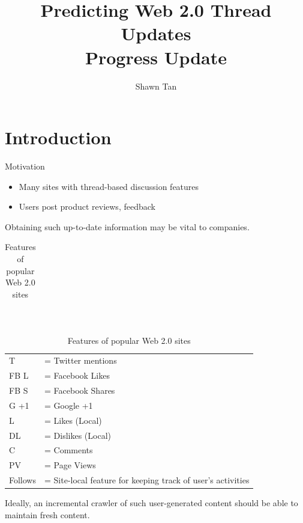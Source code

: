 \documentclass[compress]{beamer}
\title{Predicting Web 2.0 Thread Updates\\Progress Update}
\author{Shawn Tan}
\date{}
\begin{document}
\maketitle
\section{Introduction}

\begin{frame}{Motivation}
	\begin{itemize}
		\item Many sites with thread-based discussion features
		\item Users post product reviews, feedback
	\end{itemize}
	Obtaining such up-to-date information may be vital to companies.
\end{frame}

\begin{frame}
\fontsize{6pt}{7.2}\selectfont
	\begin{table}\label{table:web20}
		{
		\begin{tabular}{|l|c|c|c|c|c|c|c|c|c|c|}
			\hline
				
			\hline
		\end{tabular}
		~\\
		}
		{
	\caption{Features of popular Web 2.0 sites}
		\begin{tabular}{l l}
			   T &= Twitter mentions\\
			FB L &= Facebook Likes \\
			FB S &= Facebook Shares\\
			G +1 &= Google +1 \\
			   L &= Likes (Local) \\
			  DL &= Dislikes (Local) \\
			   C &= Comments \\
			  PV &= Page Views \\
		 Follows &= Site-local feature for keeping track of user's activities
		\end{tabular}
	}
	\end{table}
\end{frame}


\begin{frame}
	\large
Ideally, an incremental crawler of such user-generated content should be able to maintain fresh content.

\end{frame}
\end{document}
